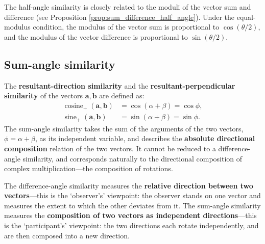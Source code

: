 \begin{remark}\label{rem:half_angle_sum_difference}
The half-angle similarity is closely related to the moduli of the vector sum and difference (see Proposition \ref{prop:sum_difference_half_angle}). Under the equal-modulus condition, the modulus of the vector sum is proportional to $\cos(\theta/2)$, and the modulus of the vector difference is proportional to $\sin(\theta/2)$.
\end{remark}

\subsection{\texorpdfstring{Sum-angle similarity}{Sum-angle similarity}}

\begin{definition}\label{def:basic_sum_similarity}
The \textbf{resultant-direction similarity} and the \textbf{resultant-perpendicular similarity} of the vectors $\mathbf{a}, \mathbf{b}$ are defined as:
\begin{align*}
\operatorname{cosine}_+(\mathbf{a}, \mathbf{b}) &= \cos(\alpha + \beta) = \cos\phi, \\
\operatorname{sine}_+(\mathbf{a}, \mathbf{b}) &= \sin(\alpha + \beta) = \sin\phi.
\end{align*}
The sum-angle similarity takes the sum of the arguments of the two vectors, $\phi = \alpha + \beta$, as its independent variable, and describes the \textbf{absolute directional composition} relation of the two vectors. It cannot be reduced to a difference-angle similarity, and corresponds naturally to the directional composition of complex multiplication---the composition of rotations.
\end{definition}

\begin{remark}\label{rem:diff_sum_distinction}
The difference-angle similarity measures the \textbf{relative direction between two vectors}---this is the `observer's' viewpoint: the observer stands on one vector and measures the extent to which the other deviates from it. The sum-angle similarity measures the \textbf{composition of two vectors as independent directions}---this is the `participant's' viewpoint: the two directions each rotate independently, and are then composed into a new direction.
\end{remark}

